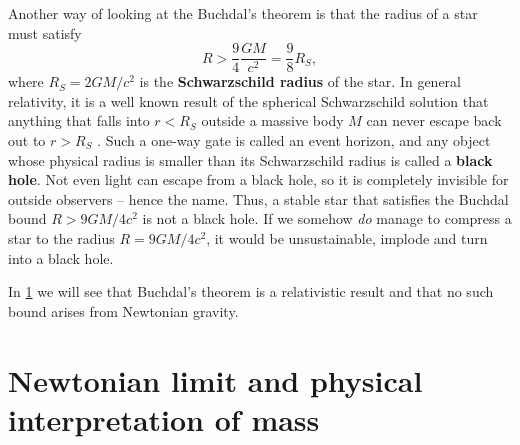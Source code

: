 Another way of looking at the Buchdal's theorem is that the radius of a star must satisfy
\begin{equation}
	R > \frac94 \frac{G M}{c^2} = \frac98 R_S ,
\end{equation}
where $R_S = 2 G M / c^2$ is the \textbf{Schwarzschild radius} of the star.
In general relativity, it is a well known result of the spherical Schwarzschild solution that anything that falls into $r < R_S$ outside a massive body $M$ can never escape back out to $r > R_S$ \cite[section 5.6]{ref:carroll}.
Such a one-way gate is called an event horizon, and any object whose physical radius is smaller than its Schwarzschild radius is called a \textbf{black hole}.
Not even light can escape from a black hole, so it is completely invisible for outside observers -- hence the name.
Thus, a stable star that satisfies the Buchdal bound $R > 9 G M / 4 c^2$ is not a black hole.
If we somehow \emph{do} manage to compress a star to the radius $R = 9 G M / 4 c^2$, it would be unsustainable, implode and turn into a black hole.

In \cref{sec:weak_field_limit} we will see that Buchdal's theorem is a relativistic result and that no such bound arises from Newtonian gravity.

\section{Newtonian limit and physical interpretation of mass}
\label{sec:weak_field_limit}



